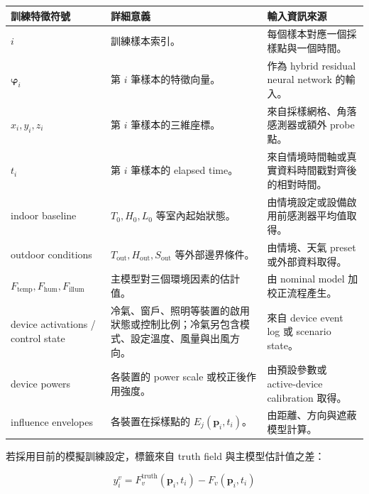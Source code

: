 \documentclass[12pt,a4paper]{article}
\begin{document}
\begin{table}[htbp]
\centering
\footnotesize
\renewcommand{\arraystretch}{1.25}
\begin{tabular}{|>{\raggedright\arraybackslash}p{}|>{\raggedright\arraybackslash}p{}|>{\raggedright\arraybackslash}p{}|}
\hline
\textbf{訓練特徵符號} & \textbf{詳細意義} & \textbf{輸入資訊來源} \\
\hline
$i$ & 訓練樣本索引。 & 每個樣本對應一個採樣點與一個時間。 \\
\hline
$\boldsymbol{\varphi}_i$ & 第 $i$ 筆樣本的特徵向量。 & 作為 hybrid residual neural network 的輸入。 \\
\hline
$x_i,y_i,z_i$ & 第 $i$ 筆樣本的三維座標。 & 來自採樣網格、角落感測器或額外 probe 點。 \\
\hline
$t_i$ & 第 $i$ 筆樣本的 elapsed time。 & 來自情境時間軸或真實資料時間戳對齊後的相對時間。 \\
\hline
indoor baseline & $T_0,H_0,L_0$ 等室內起始狀態。 & 由情境設定或設備啟用前感測器平均值取得。 \\
\hline
outdoor conditions & $T_{\mathrm{out}},H_{\mathrm{out}},S_{\mathrm{out}}$ 等外部邊界條件。 & 由情境、天氣 preset 或外部資料取得。 \\
\hline
$F_{\text{temp}},F_{\text{hum}},F_{\text{illum}}$ & 主模型對三個環境因素的估計值。 & 由 nominal model 加校正流程產生。 \\
\hline
device activations / control state & 冷氣、窗戶、照明等裝置的啟用狀態或控制比例；冷氣另包含模式、設定溫度、風量與出風方向。 & 來自 device event log 或 scenario state。 \\
\hline
device powers & 各裝置的 power scale 或校正後作用強度。 & 由預設參數或 active-device calibration 取得。 \\
\hline
influence envelopes & 各裝置在採樣點的 $E_j(\mathbf{p}_i,t_i)$。 & 由距離、方向與遮蔽模型計算。 \\
\hline
\end{tabular}
\end{table}

若採用目前的模擬訓練設定，標籤來自 truth field 與主模型估計值之差：


\[
y_i^v = F_v^{\text{truth}}(\mathbf{p}_i, t_i) - F_v(\mathbf{p}_i, t_i)
\]
\end{document}
